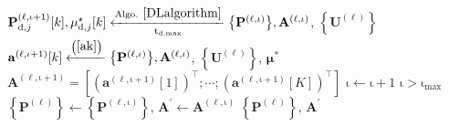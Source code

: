 \documentclass[9pt,journal]{IEEEtran}
\newcommand{\paren}[1]{\left({#1}\right)}
\newcommand{\bracket}[1]{{\left [{#1}\right ]}}
\newcommand{\braces}[1]{{\left\{ {#1}\right\}}}
\newcommand{\B}{\textrm{B}}
\begin{document}
\begin{algorithm}[ht!]
\begin{algorithmic}[1]
		\State %
		$\mathbf{P}^{\paren{\mathrm{\ell,\iota+1}}}_{\textrm{d},j}\bracket{k},\mu^\star_{\textrm{d},j}\bracket{k}\xleftarrow[\mathrm{t}_{\textrm{d,max}}]{\textrm{Algo. }\ref{DLalgorithm}}\braces{\mathbf{P}^{\paren{\mathrm{\ell,\iota}}}},\mathbf{A}^{\paren{\mathrm{\ell,\iota}}}$, $\braces{\mathbf{U}^{\paren{\mathrm{\ell}}}}$
		\EndFor
		\State %
		$\mathbf{a}^{\paren{\mathrm{\ell,\iota+1}}}\bracket{k}\xleftarrow{\paren{\mathrm{\ref{ak}}}}\braces{\mathbf{P}^{\paren{\mathrm{\ell,\iota}}}},\mathbf{A}^{\paren{\mathrm{\ell,\iota}}}$, $\braces{\mathbf{U}^{\paren{\mathrm{\ell}}}}$, $\boldsymbol{\mu}^\ast$
		\EndFor
		\State $\mathbf{A}^{\paren{\mathrm{\ell,\iota+1}}}=\bracket{\paren{\mathbf{a}^{\paren{\mathrm{\ell,\iota+1}}}\bracket{1}}^\top;\cdots;\paren{\mathbf{a}^{\paren{\mathrm{\ell,\iota+1}}}\bracket{\mathrm{\mathit{K}}}}^\top}$
		\State	$\mathrm{\iota}\leftarrow \mathrm{\iota}+1$
		\Until $\mathrm{\iota}>\mathrm{\iota}_{\textrm{max}}$
		\State $\braces{\mathbf{P}^{\paren{\ell}}}\leftarrow\braces{\mathbf{P}^{\paren{\mathrm{\ell,\iota}}}}$,  $\mathbf{A}^{\prime}\leftarrow\mathbf{A}^{\paren{\mathrm{\ell,\iota}}}$
		\State \Return $\braces{\mathbf{P}^{\paren{\ell}}}$, $\mathbf{A}^{\prime}$
	\end{algorithmic}
\end{algorithm}
\end{document}
